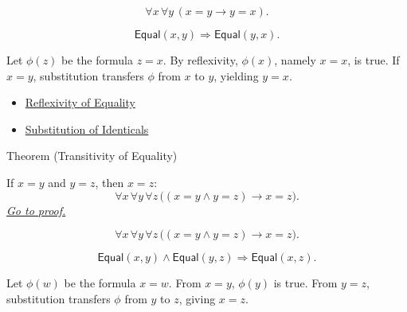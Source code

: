 \begin{remark*}
\[
  \forall x\,\forall y\,(x=y\to y=x).
\]
\end{remark*}

\begin{remark*}
\[
  \mathsf{Equal}(x,y)\Longrightarrow \mathsf{Equal}(y,x).
\]
\end{remark*}

\begin{remark*}[Interpretation]
Let \(\phi(z)\) be the formula \(z=x\). By reflexivity, \(\phi(x)\), namely
\(x=x\), is true. If \(x=y\), substitution transfers \(\phi\) from \(x\) to
\(y\), yielding \(y=x\).
\end{remark*}


\begin{dependencies}
\begin{itemize}
  \item \hyperref[ax:axiomatic-equality-reflexivity]{Reflexivity of Equality}
  \item \hyperref[ax:axiomatic-equality-substitution]{Substitution of Identicals}
\end{itemize}
\end{dependencies}

\begin{theorembox}{Theorem (Transitivity of Equality)}
\begin{theorem}\label{thm:axiomatic-equality-transitivity}
If \(x=y\) and \(y=z\), then \(x=z\):
\[
  \forall x\,\forall y\,\forall z\,
  \bigl((x=y\land y=z)\to x=z\bigr).
\]
\hyperref[prf:axiomatic-equality-transitivity]{\textit{Go to proof.}}
\end{theorem}
\end{theorembox}

\begin{remark*}
\[
  \forall x\,\forall y\,\forall z\,
  \bigl((x=y\land y=z)\to x=z\bigr).
\]
\end{remark*}

\begin{remark*}
\[
  \mathsf{Equal}(x,y)\land\mathsf{Equal}(y,z)
  \Longrightarrow
  \mathsf{Equal}(x,z).
\]
\end{remark*}

\begin{remark*}[Interpretation]
Let \(\phi(w)\) be the formula \(x=w\). From \(x=y\), \(\phi(y)\) is true. From
\(y=z\), substitution transfers \(\phi\) from \(y\) to \(z\), giving \(x=z\).
\end{remark*}

